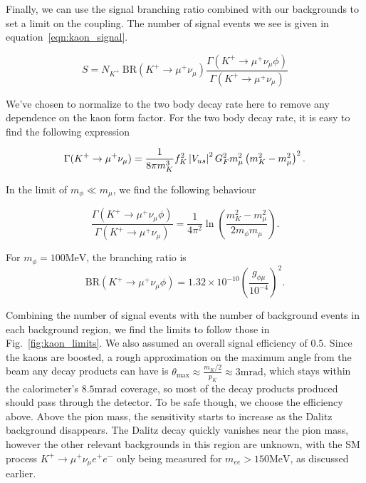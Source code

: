 Finally, we can use the signal branching ratio combined with our backgrounds to set a limit on the coupling.
The number of signal events we see is given in equation~\ref{eqn:kaon_signal}.

\begin{equation}
    S = N_{K^+}~\textrm{BR}(K^+ \rightarrow \mu^+ \nu_\mu) \frac{\Gamma(K^+ \rightarrow \mu^+ \nu_\mu \phi)}{\Gamma(K^+ \rightarrow \mu^+ \nu_\mu)}
    \label{eqn:kaon_signal}
\end{equation}

\noindent We've chosen to normalize to the two body decay rate here to remove any dependence on the kaon form factor.
For the two body decay rate, it is easy to find the following expression

\begin{equation}
    \Gamma(K^+ \rightarrow \mu^+ \nu_\mu) = \frac{1}{8\pi m_K^3}\mathnormal{f}_K^2 \left|V_{us}\right|^2 G_F^2 m_\mu^2 \left(m_K^2 - m_\mu^2\right)^2\textrm{.}
\end{equation}

\noindent In the limit of $m_\phi \ll m_\mu$, we find the following behaviour

\begin{equation}
    \frac{\Gamma(K^+ \rightarrow \mu^+ \nu_\mu \phi)}{\Gamma(K^+ \rightarrow \mu^+ \nu_\mu)} = \frac{1}{4\pi^2} \ln\left(\frac{m_K^2 - m_\mu^2}{2 m_\phi m_\mu} \right)\textrm{.}
\end{equation}

\noindent For $m_\phi = 100\textrm{MeV}$, the branching ratio is
\begin{equation}
    \textrm{BR}(K^+ \rightarrow \mu^+ \nu_\mu \phi) = 1.32\times 10^{-10} \left(\frac{g_{\phi\mu}}{10^{-4}}\right)^2\textrm{.}
\end{equation}

Combining the number of signal events with the number of background events in each background region, we find the limits to follow those in Fig.~\ref{fig:kaon_limits}.
We also assumed an overall signal efficiency of $0.5$.
Since the kaons are boosted, a rough approximation on the maximum angle from the beam any decay products can have is $\theta_\textrm{max} \approx \frac{m_K/2}{p_K} \approx 3\textrm{mrad}$, which stays within the calorimeter's $8.5\textrm{mrad}$ coverage, so most of the decay products produced should pass through the detector.
To be safe though, we choose the efficiency above.
Above the pion mass, the sensitivity starts to increase as the Dalitz background disappears.
The Dalitz decay quickly vanishes near the pion mass, however the other relevant backgrounds in this region are unknown, with the SM process $K^+ \rightarrow \mu^+ \nu_\mu e^+ e^-$ only being measured for $m_{ee} > 150\textrm{MeV}$, as discussed earlier.


